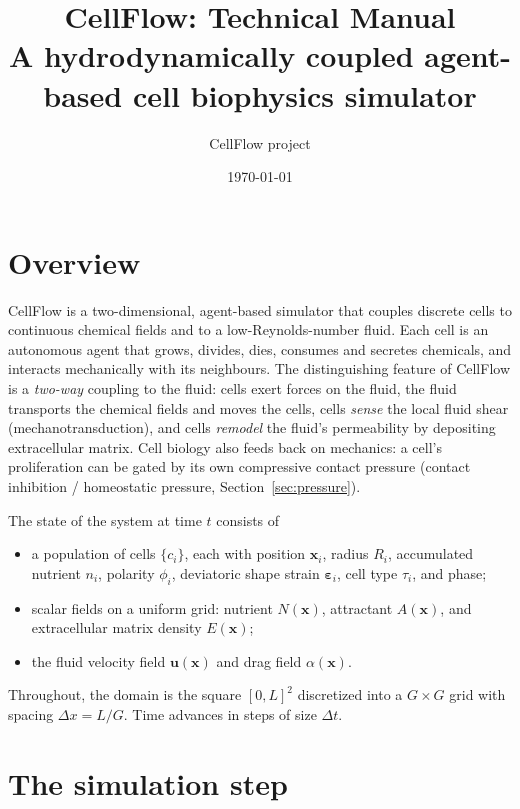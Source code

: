 \documentclass[11pt]{article}
\title{\textbf{CellFlow: Technical Manual}\\[0.3em]
\large A hydrodynamically coupled agent-based cell biophysics simulator}
\author{CellFlow project}
\date{\today}
\newcommand{\vu}{\bm{u}}
\newcommand{\vx}{\bm{x}}
\newcommand{\dt}{\Delta t}
\newcommand{\dx}{\Delta x}
\begin{document}
\maketitle
\tableofcontents
\bigskip

\section{Overview}

CellFlow is a two-dimensional, agent-based simulator that couples discrete
cells to continuous chemical fields and to a low-Reynolds-number fluid. Each
cell is an autonomous agent that grows, divides, dies, consumes and secretes
chemicals, and interacts mechanically with its neighbours. The distinguishing
feature of CellFlow is a \emph{two-way} coupling to the fluid: cells exert
forces on the fluid, the fluid transports the chemical fields and moves the
cells, cells \emph{sense} the local fluid shear (mechanotransduction), and cells
\emph{remodel} the fluid's permeability by depositing extracellular matrix.
Cell biology also feeds back on mechanics: a cell's proliferation can be gated by
its own compressive contact pressure (contact inhibition / homeostatic pressure,
Section~\ref{sec:pressure}).

The state of the system at time $t$ consists of
\begin{itemize}
  \item a population of cells $\{c_i\}$, each with position $\vx_i$, radius
        $R_i$, accumulated nutrient $n_i$, polarity $\phi_i$, deviatoric shape
        strain $\bm{\varepsilon}_i$, cell type $\tau_i$, and phase;
  \item scalar fields on a uniform grid: nutrient $N(\vx)$, attractant
        $A(\vx)$, and extracellular matrix density $E(\vx)$;
  \item the fluid velocity field $\vu(\vx)$ and drag field $\alpha(\vx)$.
\end{itemize}

Throughout, the domain is the square $[0,L]^2$ discretized into a
$G\times G$ grid with spacing $\dx = L/G$. Time advances in steps of size $\dt$.

\section{The simulation step}\label{sec:step}
\end{document}
